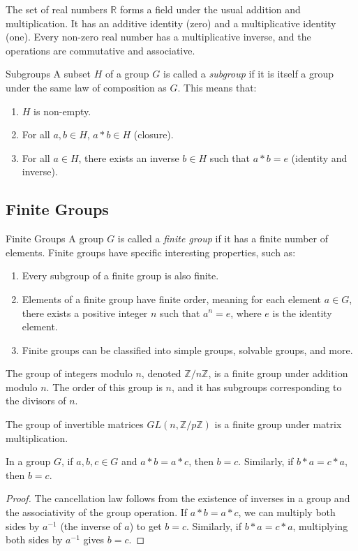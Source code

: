 \documentclass[openany]{book}
\begin{document}
\begin{example}
    The set of real numbers $\mathbb{R}$ forms a field under the usual addition and multiplication. It has an additive identity (zero) and a multiplicative identity (one). Every non-zero real number has a multiplicative inverse, and the operations are commutative and associative.
\end{example}
\begin{mydefinition}{Subgroups}
A subset $H$ of a group $G$ is called a \emph{subgroup} if it is itself a group under the same law of composition as $G$. This means that:
\begin{enumerate}
    \item $H$ is non-empty.
    \item For all $a, b \in H$, $a * b \in H$ (closure).
    \item For all $a \in H$, there exists an inverse $b \in H$ such that $a * b = e$ (identity and inverse).
\end{enumerate} 
\end{mydefinition}
\subsection{Finite Groups}
\begin{mydefinition}{Finite Groups}
A group $G$ is called a \emph{finite group} if it has a finite number of elements. Finite groups have specific interesting properties, such as:
\begin{enumerate}
    \item Every subgroup of a finite group is also finite.
    \item Elements of a finite group have finite order, meaning for each element $a \in G$, there exists a positive integer $n$ such that $a^n = e$, where $e$ is the identity element.
    \item Finite groups can be classified into simple groups, solvable groups, and more.
\end{enumerate}

\end{mydefinition}
\begin{example}
    The group of integers modulo $n$, denoted $\mathbb{Z}/n\mathbb{Z}$, is a finite group under addition modulo $n$. The order of this group is $n$, and it has subgroups corresponding to the divisors of $n$.
\end{example}
\begin{example}
    The group of invertible matrices $GL(n, \mathbb{Z}/p\mathbb{Z})$ is a finite group under matrix multiplication.
\end{example}
\begin{mytheorem}
In a group $G$, if $a, b, c \in G$ and $a * b = a * c$, then $b = c$. Similarly, if $b * a = c * a$, then $b = c$.
\end{mytheorem}
\begin{proof}
    The cancellation law follows from the existence of inverses in a group and the associativity of the group operation. If $a * b = a * c$, we can multiply both sides by $a^{-1}$ (the inverse of $a$) to get $b = c$. Similarly, if $b * a = c * a$, multiplying both sides by $a^{-1}$ gives $b = c$.
\end{proof}
\end{document}
